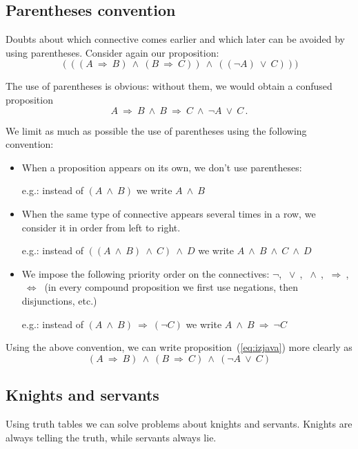 \documentclass[11pt,paper=b5,footinclude,headinclude]{scrbook} %
\def\ali {{~\vee~}}
\def\inn {{~\wedge~}}
\def\sledi {{~\Rightarrow~}}
\def\cee {{~\Leftrightarrow~}}
\theoremstyle{remark}
\theoremstyle{definition} %
\theoremstyle{theorem} %
\begin{document}
\subsection*{Parentheses convention}

Doubts about which connective comes earlier and which later can be avoided by using parentheses.
Consider again our proposition:
\begin{equation}\label{eq:izjava}
(((A \sledi B) \inn (B\sledi C)) \inn  ((\neg A) \ali C)))
\end{equation}

The use of parentheses is obvious: without them, we would obtain a confused proposition
$$A \sledi B \inn B\sledi C \inn \neg A \ali C\,.$$

We limit as much as possible the use of parentheses using the following convention:
\begin{itemize}
	\item When a proposition appears on its own, we don't use parentheses:
	
	e.g.: instead of $(A\inn B)$ we write $A\inn B$
	
	\item When the same type of connective appears several times in a row, we consider it in order from left to right.
	
	e.g.: instead of $((A\inn B) \inn C) \inn D$ we write $A\inn B \inn C\inn D$
	
	\item We impose the following priority order on the connectives:
	$\neg$, $\ali$, $\inn$, $\sledi$, $\cee$ (in every compound proposition we first use negations, then disjunctions, etc.)
	
	e.g.: instead of $(A\inn B) \sledi (\neg C)$ we write  $A\inn B \sledi\neg C$
\end{itemize}

Using the above convention, we can write proposition~(\ref{eq:izjava}) more clearly as
\begin{equation}\label{eq:izjava2}
(A \sledi B) \inn (B\sledi C) \inn  (\neg A \ali C)
\end{equation}



\subsection*{Knights and servants}

Using truth tables we can solve problems about knights and servants.
Knights are always telling the truth, while servants always lie.
\end{document}
